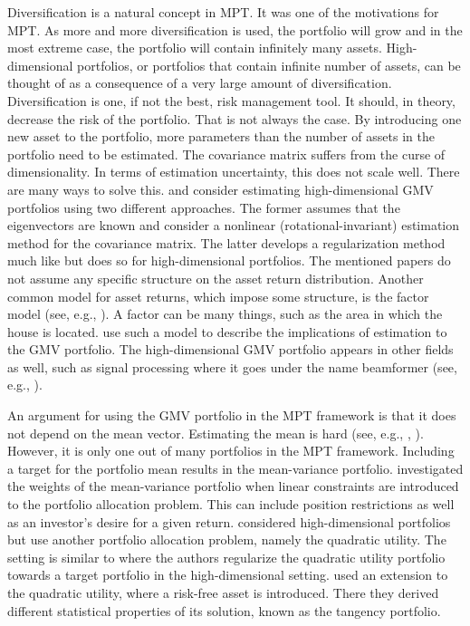 Diversification is a natural concept in MPT.
It was one of the motivations for MPT.
As more and more diversification is used, the portfolio will grow and in the most extreme case, the portfolio will contain infinitely many assets.
High-dimensional portfolios, or portfolios that contain infinite number of assets, can be thought of as a consequence of a very large amount of diversification.
Diversification is one, if not the best, risk management tool.
It should, in theory, decrease the risk of the portfolio. 
That is not always the case.
By introducing one new asset to the portfolio, more parameters than the number of assets in the portfolio need to be estimated. 
The covariance matrix suffers from the curse of dimensionality. 
In terms of estimation uncertainty, this does not scale well.
There are many ways to solve this.
\citet{lw20} and \citet{bodnar2018estimation} consider estimating high-dimensional GMV portfolios using two different approaches.
The former assumes that the eigenvectors are known and consider a nonlinear (rotational-invariant) estimation method for the covariance matrix. 
The latter develops a regularization method much like \citet{frahm2010} but does so for high-dimensional portfolios.
The mentioned papers do not assume any specific structure on the asset return distribution. 
Another common model for asset returns, which impose some structure, is the factor model (see, e.g., \cite{ross2013arbitrage}). 
A factor can be many things, such as the area in which the house is located.
\citet{ding2020high} use such a model to describe the implications of estimation to the GMV portfolio.
The high-dimensional GMV portfolio appears in other fields as well, such as signal processing where it goes under the name beamformer (see, e.g., \cite{LiStoicaWang2004}). 

An argument for using the GMV portfolio in the MPT framework is that it does not depend on the mean vector.
Estimating the mean is hard (see, e.g., \citet{merton1980estimating}, \citet{best1991sensitivity}).
However, it is only one out of many portfolios in the MPT framework.
Including a target for the portfolio mean results in the mean-variance portfolio.
\citet{el2010high} investigated the weights of the mean-variance portfolio when linear constraints are introduced to the portfolio allocation problem.
This can include position restrictions as well as an investor's desire for a given return.
\citet{bodnarokhrinparolya2020} considered high-dimensional portfolios but use another portfolio allocation problem, namely the quadratic utility.
The setting is similar to \citet{bodnar2018estimation} where the authors regularize the quadratic utility portfolio towards a target portfolio in the high-dimensional setting.
\citet{karlsson2021statistical} used an extension to the quadratic utility, where a risk-free asset is introduced.
There they derived different statistical properties of its solution, known as the tangency portfolio.

